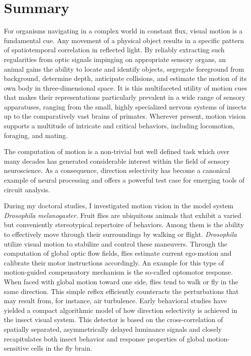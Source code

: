 
\chapter*{Summary}
\label{chp:summary}

For organisms navigating in a complex world in constant flux, visual motion is a fundamental cue. Any movement of a physical object results in a specific pattern of spatiotemporal correlation in reflected light. By reliably extracting such regularities from optic signals impinging on appropriate sensory organs, an animal gains the ability to locate and identify objects, segregate foreground from background, determine depth, anticipate collisions, and estimate the motion of its own body in three-dimensional space. It is this multifaceted utility of motion cues that makes their representations particularly prevalent in a wide range of sensory apparatuses, ranging from the small, highly specialized nervous systems of insects up to the comparatively vast brains of primates. Wherever present, motion vision supports a multitude of intricate and critical behaviors, including locomotion, foraging, and mating.

The computation of motion is a non-trivial but well defined task which over many decades has generated considerable interest within the field of sensory neuroscience. As a consequence, direction selectivity has become a canonical example of neural processing and offers a powerful test case for emerging tools of circuit analysis.

During my doctoral studies, I investigated motion vision in the model system \textit{Drosophila melanogaster}. Fruit flies are ubiquitous animals that exhibit a varied but conveniently stereotypical repertoire of behaviors. Among them is the ability to effectively move through their surroundings by walking or flight. \textit{Drosophila} utilize visual motion to stabilize and control these maneuvers. Through the computation of global optic flow fields, flies estimate current ego-motion and calibrate their motor instructions accordingly. An example for this type of motion-guided compensatory mechanism is the so-called optomotor response. When faced with global motion toward one side, flies tend to walk or fly in the same direction. This simple reflex efficiently counteracts the perturbations that may result from, for instance, air turbulence. Early behavioral studies have yielded a compact algorithmic model of how direction selectivity is achieved in the insect visual system. This detector is based on the cross-correlation of spatially separated, asymmetrically delayed luminance signals and closely recapitulates both insect behavior and response properties of global motion-sensitive cells in the fly brain.

